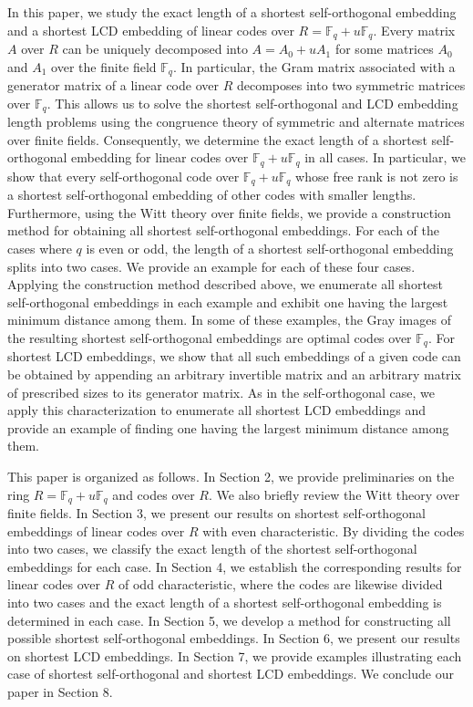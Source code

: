 \documentclass{article}
\theoremstyle{definition}
\theoremstyle{remark}
\begin{document}
In this paper, we study the exact length of a shortest self-orthogonal embedding and a shortest LCD embedding of linear codes over $R=\mathbb{F}_q+u\mathbb{F}_q$. Every matrix $A$ over $R$ can be uniquely decomposed into $A=A_0+uA_1$ for some matrices $A_0$ and $A_1$ over the finite field $\mathbb{F}_q$. In particular, the Gram matrix associated with a generator matrix of a linear code over $R$ decomposes into two symmetric matrices over $\mathbb{F}_q$. This allows us to solve the shortest self-orthogonal and LCD embedding length problems using the congruence theory of symmetric and alternate matrices over finite fields. Consequently, we determine the exact length of a shortest self-orthogonal embedding for linear codes over $\mathbb F_q+u\mathbb F_q$ in all cases. In particular, we show that every self-orthogonal code over $\mathbb{F}_q+u\mathbb{F}_q$ whose free rank is not zero is a shortest self-orthogonal embedding of other codes with smaller lengths. Furthermore, using the Witt theory over finite fields, we provide a construction method for obtaining all shortest self-orthogonal embeddings. For each of the cases where $q$ is even or odd, the length of a shortest self-orthogonal embedding splits into two cases. We provide an example for each of these four cases. Applying the construction method described above, we enumerate all shortest self-orthogonal embeddings in each example and exhibit one having the largest minimum distance among them. In some of these examples, the Gray images of the resulting shortest self-orthogonal embeddings are optimal codes over $\mathbb{F}_q$. For shortest LCD embeddings, we show that all such embeddings of a given code can be obtained by appending an arbitrary invertible matrix and an arbitrary matrix of prescribed sizes to its generator matrix. As in the self-orthogonal case, we apply this characterization to enumerate all shortest LCD embeddings and provide an example of finding one having the largest minimum distance among them.

This paper is organized as follows. In Section 2, we provide preliminaries on the ring $R=\mathbb{F}_q+u\mathbb{F}_q$ and codes over $R$. We also briefly review the Witt theory over finite fields. In Section 3, we present our results on shortest self-orthogonal embeddings of linear codes over $R$ with even characteristic. By dividing the codes into two cases, we classify the exact length of the shortest self-orthogonal embeddings for each case. In Section 4, we establish the corresponding results for linear codes over $R$ of odd characteristic, where the codes are likewise divided into two cases and the exact length of a shortest self-orthogonal embedding is determined in each case. In Section 5, we develop a method for constructing all possible shortest self-orthogonal embeddings. In Section 6, we present our results on shortest LCD embeddings. In Section 7, we provide examples illustrating each case of shortest self-orthogonal and shortest LCD embeddings. We conclude our paper in Section 8.
\end{document}
